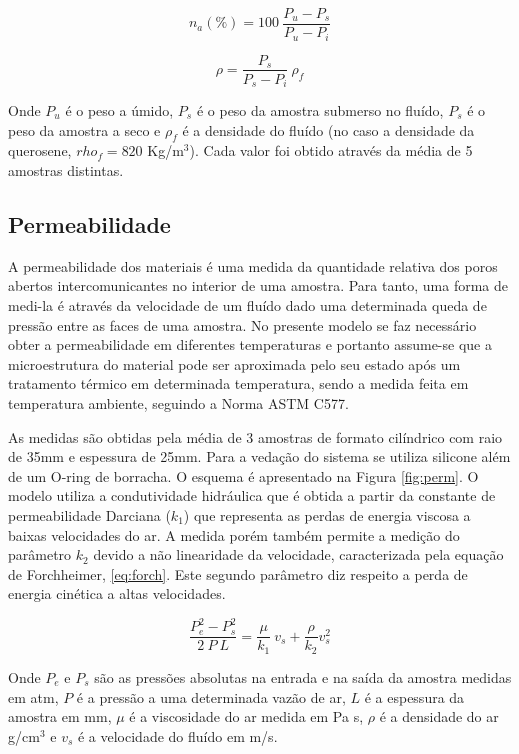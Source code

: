 \begin{equation}
  \label{eq:PA}
  n_a (\%)= 100 \ \frac{P_u-P_s}{P_u-P_i}
\end{equation}

\begin{equation}
  \label{eq:DA}
  \rho = \frac{P_s}{P_s - P_i} \ \rho_f
\end{equation}

Onde $P_u$ é o peso a úmido, $P_s$ é o peso da amostra submerso no fluído, $P_s$
é o peso da amostra a seco e $\rho_f$ é a densidade do fluído (no caso a
densidade da querosene, $rho_f = 820$ Kg/m$^3$). Cada valor foi obtido através
da média de 5 amostras distintas.
    
\subsection{Permeabilidade}\label{mat:perm}

A permeabilidade dos materiais é uma medida da quantidade relativa dos poros
abertos intercomunicantes no interior de uma amostra. Para tanto, uma forma de
medi-la é através da velocidade de um fluído dado uma determinada queda de
pressão entre as faces de uma amostra. No presente modelo se faz necessário
obter a permeabilidade em diferentes temperaturas e portanto assume-se que a
microestrutura do material pode ser aproximada pelo seu estado após um
tratamento térmico em determinada temperatura, sendo a medida feita em
temperatura ambiente, seguindo a Norma ASTM C577.

As medidas são obtidas pela média de 3 amostras de formato cilíndrico com raio
de 35mm e espessura de 25mm. Para a vedação do sistema se utiliza silicone além
de um O-ring de borracha. O esquema é apresentado na Figura \ref{fig:perm}. O
modelo utiliza a condutividade hidráulica que é obtida a partir da constante de
permeabilidade Darciana ($k_1$) que representa as perdas de energia viscosa a
baixas velocidades do ar. A medida porém também permite a medição do parâmetro
$k_2$ devido a não linearidade da velocidade, caracterizada pela equação de
Forchheimer, \ref{eq:forch}. Este segundo parâmetro diz respeito a perda de
energia cinética a altas velocidades.

\begin{equation}
  \label{eq:forch}
  \frac{P_e^2 - P_s^2}{2 \ P \ L} = \frac{\mu}{k_1} \ v_s + \frac{\rho}{k_2}v_s^2
\end{equation}

Onde $P_e$ e $P_s$ são as pressões absolutas na entrada e na saída da amostra
medidas em atm, $P$ é a pressão a uma determinada vazão de ar, $L$ é a espessura
da amostra em mm, $\mu$ é a viscosidade do ar medida em Pa s, $\rho$ é a
densidade do ar g/cm$^3$ e $v_s$ é a velocidade do fluído em m/s.

